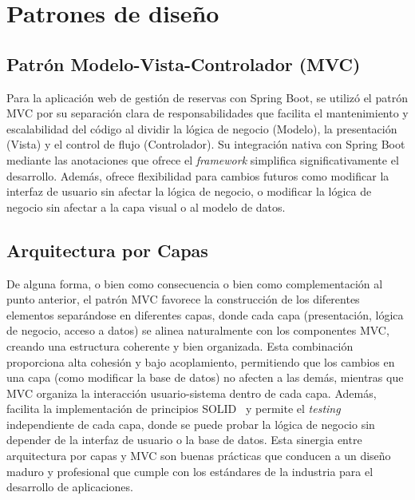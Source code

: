 \section{Patrones de diseño}\label{patron-de-diseño}

\subsection{Patrón Modelo-Vista-Controlador (MVC)}\label{patron-modelo-vista-controlador}
Para la aplicación web de gestión de reservas con Spring Boot, se utilizó el patrón MVC por su separación clara de responsabilidades que facilita el mantenimiento y escalabilidad del código al dividir la lógica de negocio (Modelo), la presentación (Vista) y el control de flujo (Controlador). Su integración nativa con Spring Boot mediante las anotaciones que ofrece el \emph{framework} simplifica significativamente el desarrollo. Además, ofrece flexibilidad para cambios futuros como modificar la interfaz de usuario sin afectar la lógica de negocio, o modificar la lógica de negocio sin afectar a la capa visual o al modelo de datos.

\subsection{Arquitectura por Capas}\label{arquitectura-por-capas}
De alguna forma, o bien como consecuencia o bien como complementación al punto anterior, el patrón MVC favorece la construcción de los diferentes elementos separándose en diferentes capas, donde cada capa (presentación, lógica de negocio, acceso a datos) se alinea naturalmente con los componentes MVC, creando una estructura coherente y bien organizada. Esta combinación proporciona alta cohesión y bajo acoplamiento, permitiendo que los cambios en una capa (como modificar la base de datos) no afecten a las demás, mientras que MVC organiza la interacción usuario-sistema dentro de cada capa. Además, facilita la implementación de principios SOLID~\cite{solid} y permite el \emph{testing} independiente de cada capa, donde se puede probar la lógica de negocio sin depender de la interfaz de usuario o la base de datos. Esta sinergia entre arquitectura por capas y MVC son buenas prácticas que conducen a un diseño maduro y profesional que cumple con los estándares de la industria para el desarrollo de aplicaciones.

